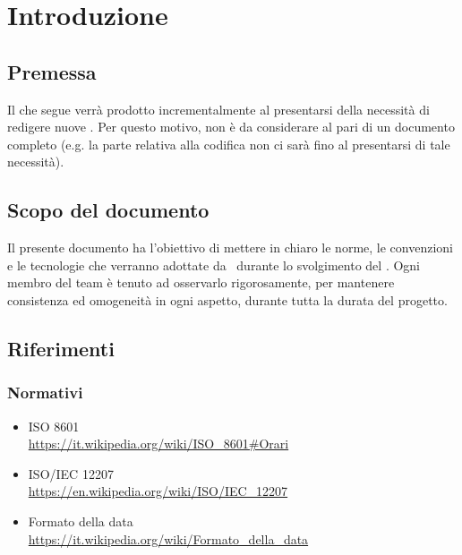 \section{Introduzione}

    \subsection{Premessa}
    Il  che segue verrà prodotto incrementalmente al presentarsi della necessità di redigere nuove .
    Per questo motivo, non è da considerare al pari di un documento completo (e.g. la parte relativa alla codifica non ci sarà fino
    al presentarsi di tale necessità).

    \subsection{Scopo del documento}
    Il presente documento ha l’obiettivo di mettere in chiaro le norme, le convenzioni e le tecnologie che verranno adottate da \gruppo\ durante lo svolgimento del . Ogni membro del team \`e tenuto ad osservarlo rigorosamente, per mantenere consistenza ed omogeneit\`a in ogni aspetto, durante tutta la durata del progetto.\par

    

    

\subsection{Riferimenti}

    \subsubsection{Normativi}	\label{rifnorma}
    \begin{itemize}
    	\item ISO 8601 \\\url{https://it.wikipedia.org/wiki/ISO\_8601#Orari}
    	\item ISO/IEC 12207 \\\url{https://en.wikipedia.org/wiki/ISO/IEC_12207}
    	\item Formato della data \\\url{https://it.wikipedia.org/wiki/Formato\_della\_data}
    \end{itemize}

